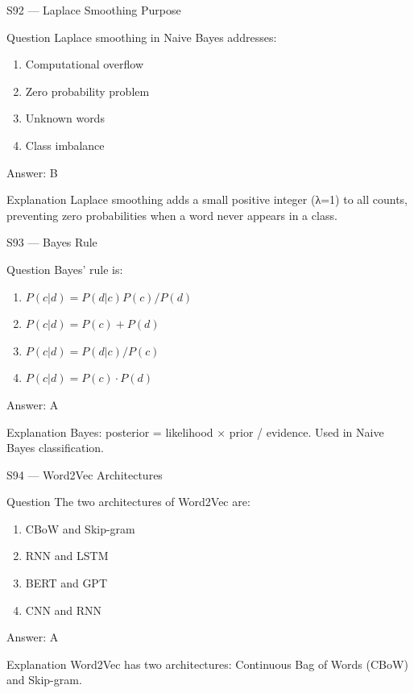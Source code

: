\documentclass[aspectratio=169,8pt]{beamer}
\begin{document}
	\begin{frame}{S92 --- Laplace Smoothing Purpose}
		\begin{block}{Question}
			Laplace smoothing in Naive Bayes addresses:
			\begin{enumerate}
				\item Computational overflow
				\item Zero probability problem
				\item Unknown words
				\item Class imbalance
			\end{enumerate}
		\end{block}
		\begin{exampleblock}{Answer: B}\end{exampleblock}
		\begin{block}{Explanation}
			Laplace smoothing adds a small positive integer (λ=1) to all counts, preventing zero probabilities when a word never appears in a class.
		\end{block}
	\end{frame}
	
	\begin{frame}{S93 --- Bayes Rule}
		\begin{block}{Question}
			Bayes' rule is:
			\begin{enumerate}
				\item $P(c|d) = P(d|c)P(c)/P(d)$
				\item $P(c|d) = P(c) + P(d)$
				\item $P(c|d) = P(d|c)/P(c)$
				\item $P(c|d) = P(c) \cdot P(d)$
			\end{enumerate}
		\end{block}
		\begin{exampleblock}{Answer: A}\end{exampleblock}
		\begin{block}{Explanation}
			Bayes: posterior = likelihood × prior / evidence. Used in Naive Bayes classification.
		\end{block}
	\end{frame}
	
	\begin{frame}{S94 --- Word2Vec Architectures}
		\begin{block}{Question}
			The two architectures of Word2Vec are:
			\begin{enumerate}
				\item CBoW and Skip-gram
				\item RNN and LSTM
				\item BERT and GPT
				\item CNN and RNN
			\end{enumerate}
		\end{block}
		\begin{exampleblock}{Answer: A}\end{exampleblock}
		\begin{block}{Explanation}
			Word2Vec has two architectures: Continuous Bag of Words (CBoW) and Skip-gram.
		\end{block}
	\end{frame}
	
\end{document}
